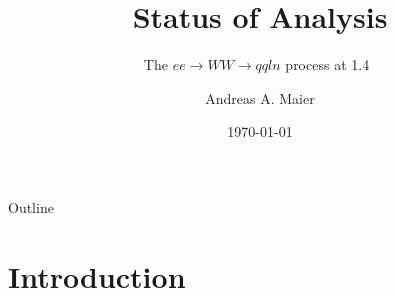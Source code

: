 \documentclass{beamer}
\title{Status of Analysis}
\subtitle{The $ee \rightarrow WW \rightarrow qqln$ process at 1.4~\TeV}
\author{Andreas A. Maier\inst{1}}
\institute[CERN] %
{
  \inst{1}%
  CERN
}
\date{\today}
\begin{document}
\begin{frame}
  \titlepage
\end{frame}






























\begin{frame}{Outline}
  \begin{multicols}{2}
    \tableofcontents
  \end{multicols}
\end{frame}









\section{Introduction}
\end{document}
